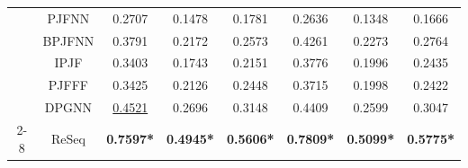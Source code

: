 \begin{table}[]
{{\begin{tabular}{@{}cccccccc@{}}
                             & PJFNN       & 0.2707          & 0.1478          & 0.1781          & 0.2636          & 0.1348          & 0.1666          \\
                             & BPJFNN      & 0.3791          & 0.2172          & 0.2573          & 0.4261          & 0.2273          & 0.2764          \\
                             & IPJF        & 0.3403          & 0.1743          & 0.2151          & 0.3776          & 0.1996          & 0.2435          \\
                             & PJFFF       & 0.3425          & 0.2126          & 0.2448          & 0.3715          & 0.1998          & 0.2422          \\
                             & DPGNN       & \underline{0.4521}    & 0.2696          & 0.3148          & 0.4409          & 0.2599          & 0.3047          \\ \cmidrule(l){2-8}
                             & ReSeq        & \textbf{0.7597*} & \textbf{0.4945*} & \textbf{0.5606*} & \textbf{0.7809*} & \textbf{0.5099*} & \textbf{0.5775*} \\ \bottomrule
\end{tabular}}}
\end{table}

